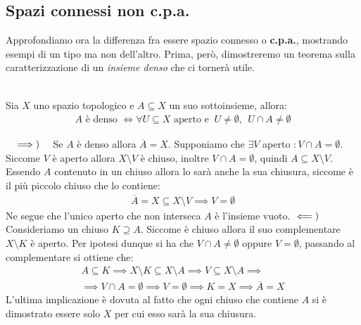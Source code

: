 \subsection{Spazi connessi non c.p.a.}
Approfondiamo ora la differenza fra essere spazio connesso o \textbf{c.p.a.}, mostrando esempi di un tipo ma non dell'altro. Prima, però, dimostreremo un teorema sulla caratterizzazione di un \textit{insieme denso} che ci tornerà utile.
\begin{theorema}~{}\\
	Sia $X$ uno spazio topologico e $A\subseteq X$ un suo sottoinsieme, allora:
		\begin{gather*}
			A \text{ è denso }\iff \forall U\subseteq X \text{ aperto e } \ U\neq\emptyset, \ \ U\cap A\neq\emptyset	
		\end{gather*}
	\vspace{-6mm}
\end{theorema}
\begin{demonstration}~{}
	$\implies)\quad$ Se $A$ è denso allora $\overline{A}=X$. Supponiamo che $\exists V$ aperto $\colon V\cap A=\emptyset$. Siccome $V$ è aperto allora $X\setminus V$ è chiuso, inoltre $V\cap A=\emptyset$, quindi $A\subseteq X\setminus V$. Essendo $A$ contenuto in un chiuso allora lo sarà anche la sua chiusura, siccome è il più piccolo chiuso che lo contiene:
		\begin{gather*}
			\overline{A}=X\subseteq X\setminus V \implies V=\emptyset
		\end{gather*}
	Ne segue che l'unico aperto che non interseca $A$ è l'insieme vuoto. \newline
	$\impliedby)\quad$ Consideriamo un chiuso $K\supseteq A$. Siccome è chiuso allora il suo complementare $X\setminus K$ è aperto. Per ipotesi dunque si ha che $V\cap A\neq \emptyset$ oppure $V=\emptyset$, passando al complementare si ottiene che:
		\begin{equation*}
			\begin{array}{l}
				A\subseteq K \implies X\setminus K \subseteq X\setminus A \implies V\subseteq X\setminus A \implies \\
				\implies V\cap A=\emptyset \implies V=\emptyset \implies K=X \implies \overline{A}=X
			\end{array}
		\end{equation*}
	L'ultima implicazione è dovuta al fatto che ogni chiuso che contiene $A$ si è dimostrato essere solo $X$ per cui esso sarà la sua chiusura.
\end{demonstration}

